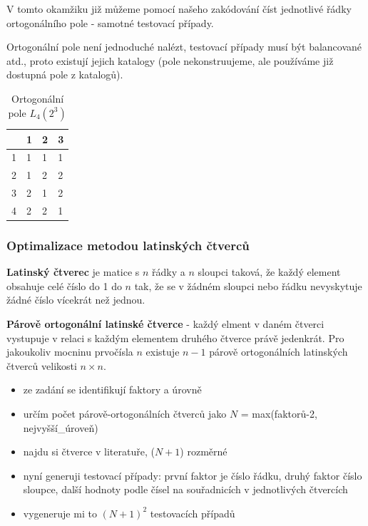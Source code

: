 V tomto okamžiku již můžeme pomocí našeho zakódování číst jednotlivé řádky ortogonálního pole - samotné testovací případy.

Ortogonální pole není jednoduché nalézt, testovací případy musí být balancované atd., proto existují jejich katalogy (pole nekonstruujeme, ale používáme již dostupná pole z katalogů).

\begin{table}[h]
\begin{tabular}{|l|l|l|l|}
\hline
  & 1 & 2 & 3 \\ \hline
1 & 1 & 1 & 1 \\ \hline
2 & 1 & 2 & 2 \\ \hline
3 & 2 & 1 & 2  \\ \hline
4 & 2 & 2 & 1 \\ \hline
\end{tabular}
\vspace{10px}
\caption{Ortogonální pole $L_4 (2^3)$}
\end{table}

\subsubsection{Optimalizace metodou latinských čtverců}


\textbf{Latinský čtverec} je matice s $n$ řádky a $n$ sloupci taková, že každý element obsahuje celé číslo do 1 do $n$ tak, že se v žádném sloupci nebo řádku nevyskytuje žádné číslo vícekrát než jednou.

\textbf{Párově ortogonální latinské čtverce} - každý elment v daném čtverci vystupuje v relaci s každým elementem druhého čtverce právě jedenkrát. Pro jakoukoliv mocninu prvočísla $n$ existuje $n-1$ párově ortogonálních latinských čtverců velikosti $n \times n$.

\begin{itemize}[itemsep=0px]
\item ze zadání se identifikují faktory a úrovně
\item určím počet párově-ortogonálních čtverců jako $N$ = max(faktorů-2, nejvyšší\_úroveň)
\item najdu si čtverce v literatuře, ($N+1$) rozměrné
\item nyní generuji testovací případy: první faktor je číslo řádku, druhý faktor číslo sloupce, další hodnoty podle čísel na souřadnicích v jednotlivých čtvercích
\item vygeneruje mi to $(N+1)^2$ testovacích případů
\end{itemize}

